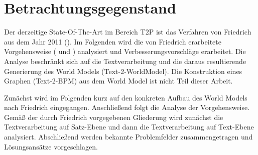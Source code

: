 \section{Betrachtungsgegenstand}
Der derzeitige State-Of-The-Art im Bereich \ac{T2P} ist das Verfahren von Friedrich aus dem Jahr 2011 (\cite[vgl.][11]{RIEFER}). Im Folgenden wird die von Friedrich erarbeitete Vorgehensweise (\cite[vgl.][]{FRIEDRICH1} und \cite[vgl.][]{FRIEDRICH2}) analysiert und Verbesserungsvorschläge erarbeitet. Die Analyse beschränkt sich auf die Textverarbeitung und die daraus resultierende Generierung des World Models (Text-2-WorldModel). Die Konstruktion eines Graphen (Text-2-BPM) aus dem World Model ist nicht Teil dieser Arbeit.
\par
Zunächst wird im Folgenden kurz auf den konkreten Aufbau des World Models nach Friedrich eingegangen. Anschließend folgt die Analyse der Vorgehensweise. Gemäß der durch Friedrich vorgegebenen Gliederung wird zunächst die Textverarbeitung auf Satz-Ebene und dann die Textverarbeitung auf Text-Ebene analysiert. Abschließend werden bekannte Problemfelder zusammengetragen und Lösungsansätze vorgeschlagen.

